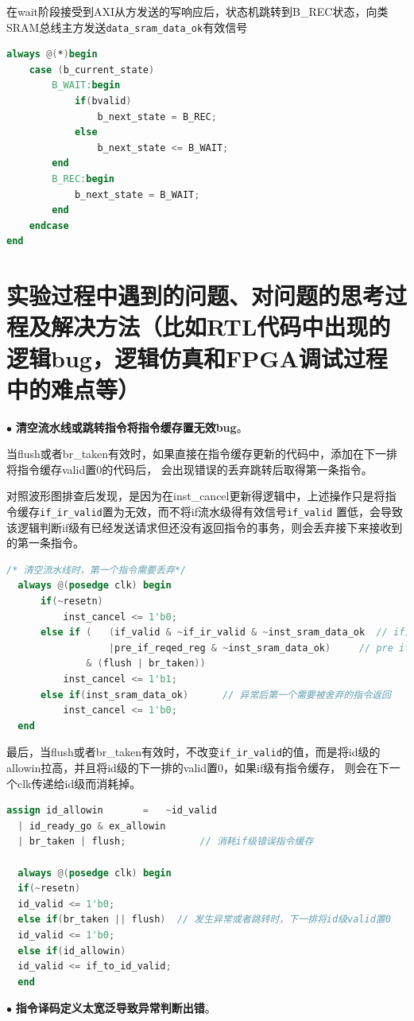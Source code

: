 \documentclass[11pt]{article}
\begin{document}
\begin{enumerate}
\begin{enumerate}
  在wait阶段接受到AXI从方发送的写响应后，状态机跳转到B\_REC状态，向类SRAM总线主方发送\verb|data_sram_data_ok|有效信号

  \begin{lstlisting}[language=verilog]
always @(*)begin
    case (b_current_state)
        B_WAIT:begin
            if(bvalid)
                b_next_state = B_REC;
            else 
                b_next_state <= B_WAIT;
        end
        B_REC:begin
            b_next_state = B_WAIT;
        end
    endcase
end
  \end{lstlisting}
\end{enumerate}

\end{enumerate}





\section{实验过程中遇到的问题、对问题的思考过程及解决方法（比如RTL代码中出现的逻辑bug，逻辑仿真和FPGA调试过程中的难点等）}

\noindent
$\bullet$
\textbf{清空流水线或跳转指令将指令缓存置无效bug}。

当flush或者br\_taken有效时，如果直接在指令缓存更新的代码中，添加在下一排将指令缓存valid置0的代码后，
会出现错误的丢弃跳转后取得第一条指令。

对照波形图排查后发现，是因为在inst\_cancel更新得逻辑中，上述操作只是将指令缓存\verb|if_ir_valid|置为无效，而不将if流水级得有效信号\verb|if_valid|
置低，会导致该逻辑判断if级有已经发送请求但还没有返回指令的事务，则会丢弃接下来接收到的第一条指令。

\begin{lstlisting}[language=verilog]
  /* 清空流水线时，第一个指令需要丢弃*/
  always @(posedge clk) begin
      if(~resetn)
          inst_cancel <= 1'b0;
      else if (   (if_valid & ~if_ir_valid & ~inst_sram_data_ok  // if正在等待指令返回
                  |pre_if_reqed_reg & ~inst_sram_data_ok)     // pre if 正在等待指令返回
              & (flush | br_taken))
          inst_cancel <= 1'b1;
      else if(inst_sram_data_ok)      // 异常后第一个需要被舍弃的指令返回
          inst_cancel <= 1'b0;
  end
\end{lstlisting}

最后，当flush或者br\_taken有效时，不改变\verb|if_ir_valid|的值，而是将id级的allowin拉高，并且将id级的下一排的valid置0，如果if级有指令缓存，
则会在下一个clk传递给id级而消耗掉。
\begin{lstlisting}[language=verilog]
  assign id_allowin       =   ~id_valid 
  | id_ready_go & ex_allowin 
  | br_taken | flush;             // 消耗if级错误指令缓存 
  
  always @(posedge clk) begin
  if(~resetn)
  id_valid <= 1'b0;
  else if(br_taken || flush)  // 发生异常或者跳转时，下一排将id级valid置0
  id_valid <= 1'b0;
  else if(id_allowin)
  id_valid <= if_to_id_valid;
  end
\end{lstlisting}
\noindent
$\bullet$
\textbf{指令译码定义太宽泛导致异常判断出错}。
\end{document}
